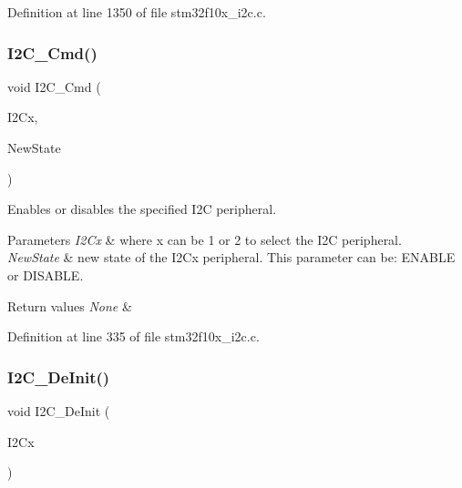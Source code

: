 Definition at line 1350 of file stm32f10x\+\_\+i2c.\+c.

\mbox{\label{group___i2_c___exported___functions_ga7e1323c9133c2cb424dfb5b10b7d2f0b}} 
\subsubsection{\texorpdfstring{I2\+C\+\_\+\+Cmd()}{I2C\_Cmd()}}
{\footnotesize\ttfamily void I2\+C\+\_\+\+Cmd (\begin{DoxyParamCaption}\item[{\hyperlink{struct_i2_c___type_def}{I2\+C\+\_\+\+Type\+Def} $\ast$}]{I2\+Cx,  }\item[{\hyperlink{group___exported__types_gac9a7e9a35d2513ec15c3b537aaa4fba1}{Functional\+State}}]{New\+State }\end{DoxyParamCaption})}



Enables or disables the specified I2C peripheral. 


\begin{DoxyParams}{Parameters}
{\em I2\+Cx} & where x can be 1 or 2 to select the I2C peripheral. \\
\hline
{\em New\+State} & new state of the I2\+Cx peripheral. This parameter can be\+: E\+N\+A\+B\+LE or D\+I\+S\+A\+B\+LE. \\
\hline
\end{DoxyParams}

\begin{DoxyRetVals}{Return values}
{\em None} & \\
\hline
\end{DoxyRetVals}


Definition at line 335 of file stm32f10x\+\_\+i2c.\+c.

\mbox{\label{group___i2_c___exported___functions_ga2ee214364603059ad5d9089f749f5bfd}} 
\subsubsection{\texorpdfstring{I2\+C\+\_\+\+De\+Init()}{I2C\_DeInit()}}
{\footnotesize\ttfamily void I2\+C\+\_\+\+De\+Init (\begin{DoxyParamCaption}\item[{\hyperlink{struct_i2_c___type_def}{I2\+C\+\_\+\+Type\+Def} $\ast$}]{I2\+Cx }\end{DoxyParamCaption})}



